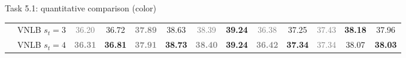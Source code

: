\documentclass[mathserif, 8pt]{beamer}
\newcommand{\best}[1]{#1}
\newcommand{\bsic}[1]{\textcolor{gray}{#1}}
\newcommand{\Bsic}[1]{\textcolor{gray}{\textbf{#1}}}
\newcommand{\Best}[1]{\textbf{\textcolor{MyOrangeBrighter}{#1}}}
\begin{document}
\begin{frame}{Task 5.1: quantitative comparison (color)}
\begin{center}
{\begin{tabular}{ c | l |c c | c c | c c | c c | c c | c}
			                      & VNLB   $s_t = 3$     & \bsic{36.20} &       36.72  & \Bsic{37.89} &       38.63  & \bsic{38.39} & \Best{39.24} & \bsic{36.38} & \best{37.25} & \bsic{37.43} & \Best{38.18} & \best{37.96} \\
			                      & VNLB   $s_t = 4$     & \Bsic{36.31} & \Best{36.81} & \Bsic{37.91} & \Best{38.73} & \Bsic{38.40} & \Best{39.24} & \Bsic{36.42} & \Best{37.34} & \bsic{37.34} &       38.07  & \Best{38.03} \\\hline
%                                                                                                                                                                                                                          

\end{tabular}}
\end{center}
\end{frame}
\end{document}
